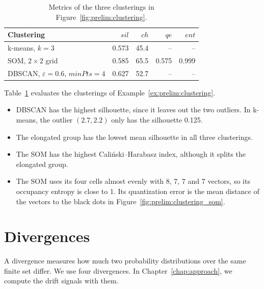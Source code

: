 \begin{table}[htb]
	\centering
	\caption[Evaluation of the example clusterings]{%
		Metrics of the three clusterings in Figure~\ref{fig:prelim:clustering}.}
	\label{tab:prelim:cluster_eval}
	\begin{tabular}{@{}lrrrr@{}}
		\toprule
		Clustering                                         & $\mathit{sil}$ & $\mathit{ch}$ & $\mathit{qe}$ & $\mathit{ent}$ \\
		\midrule
		k-means, $k = 3$                                   & 0.573          & 45.4          & --            & --             \\
		SOM, $2 \times 2$ grid                             & 0.585          & 65.5          & 0.575         & 0.999          \\
		DBSCAN, $\varepsilon = 0.6$, $\mathit{minPts} = 4$ & 0.627          & 52.7          & --            & --             \\
		\bottomrule
	\end{tabular}
\end{table}

\begin{example}
	\label{ex:prelim:cluster_eval}
	Table~\ref{tab:prelim:cluster_eval} evaluates the clusterings of Example~\ref{ex:prelim:clustering}.
	\begin{itemize}[beginpenalty=10000]
		\item DBSCAN has the highest silhouette, since it leaves out the two outliers. In k-means, the outlier $(2.7, 2.2)$ only has the silhouette 0.125.

		\item The elongated group has the lowest mean silhouette in all three clusterings.

		\item The SOM has the highest Cali\'nski--Harabasz index, although it splits the elongated group.

		\item The SOM uses its four cells almost evenly with 8, 7, 7 and 7 vectors, so its occupancy entropy is close to 1. Its quantization error is the mean distance of the vectors to the black dots in Figure~\ref{fig:prelim:clustering_som}.
	\end{itemize}
\end{example}

\section{Divergences}
\label{sec:prelim:divergences}
A divergence measures how much two probability distributions over the same finite set differ. We use four divergences. In Chapter~\ref{chap:approach}, we compute the drift signals with them.

